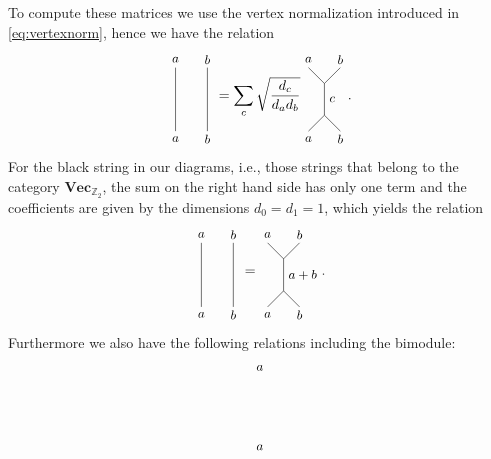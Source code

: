{To compute these matrices we use the vertex normalization introduced in \cref{eq:vertexnorm}, hence we have the relation
	\begin{equation}
		\begin{tikzpicture}[scale=0.8,baseline=(current bounding box.center)]
			\node at (0,0) {\small $a$};
			\node at (1,0) {\small $b$};
			\node at (0,2.5) {\small $a$};
			\node at (1,2.5) {\small $b$};
			\draw (0,0.25) -- (0,2.25);
			\draw (1,0.25) -- (1,2.25);
		\end{tikzpicture}=\sum_c\sqrt{\frac{d_c}{d_a d_b}}
		\begin{tikzpicture}[scale=0.8,baseline=(current bounding box.center)]
			\node at (0,0) {\small $a$};
			\node at (1,0) {\small $b$};
			\node at (0,2.5) {\small $a$};
			\node at (1,2.5) {\small $b$};
			\draw (0,0.25) -- (0.5,0.75) to node[right] {\small $c$} (0.5,1.75) -- (0,2.25);
			\draw (1,0.25) -- (0.5,0.75);
			\draw (1,2.25) -- (0.5,1.75);
		\end{tikzpicture}.
	\end{equation}
For the black string in our diagrams, i.e., those strings that belong to the category $\mathbf{Vec}_{\mathbb{Z}_2}$, the sum on the right hand side has only one term and the coefficients are given by the dimensions $d_0=d_1=1$, which yields the relation
	\begin{equation}
	\label{eq:normGD}
		\begin{tikzpicture}[scale=0.8,baseline=(current bounding box.center)]
			\node at (0,0) {\small $a$};
			\node at (1,0) {\small $b$};
			\node at (0,2.5) {\small $a$};
			\node at (1,2.5) {\small $b$};
			\draw (0,0.25) -- (0,2.25);
			\draw (1,0.25) -- (1,2.25);
		\end{tikzpicture}=
		\begin{tikzpicture}[scale=0.8,baseline=(current bounding box.center)]
			\node at (0,0) {\small $a$};
			\node at (1,0) {\small $b$};
			\node at (0,2.5) {\small $a$};
			\node at (1,2.5) {\small $b$};
			\draw (0,0.25) -- (0.5,0.75) to node[right] {\small $a+b$} (0.5,1.75) -- (0,2.25);
			\draw (1,0.25) -- (0.5,0.75);
			\draw (1,2.25) -- (0.5,1.75);
		\end{tikzpicture}.
	\end{equation}
Furthermore we also have the following relations including the bimodule:
	\begin{equation}
		\begin{tikzpicture}[scale=0.8,baseline=(current bounding box.center)]
			\node at (1,0) {\small $a$};
			\node at (1,2.5) {\small $a$};

\end{tikzpicture}
\end{equation}}
